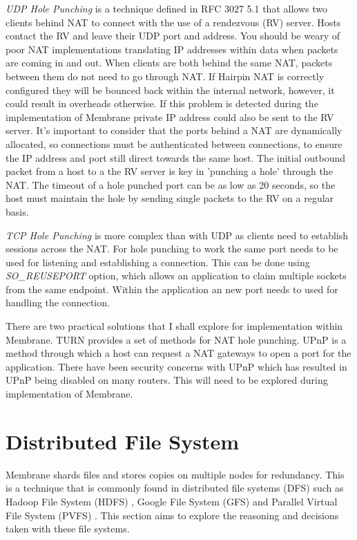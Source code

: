 \documentclass[11pt, a4paper, twocolumn, twoside]{report}
\begin{document}
\emph{UDP Hole Punching} is a technique defined in RFC 3027 5.1 \citep{holdrege2001rfc} that allows two clients behind NAT to connect with the use of a rendezvous (RV) server. Hosts contact the RV and leave their UDP port and address. You should be weary of poor NAT implementations translating IP addresses within data when packets are coming in and out. \citep{ford2005peer} When clients are both behind the same NAT, packets between them do not need to go through NAT. If Hairpin NAT is correctly configured they will be bounced back within the internal network, however, it could result in overheads otherwise. If this problem is detected during the implementation of Membrane private IP address could also be sent to the RV server. It's important to consider that the ports behind a NAT are dynamically allocated, so connections must be authenticated between connections, to ensure the IP address and port still direct towards the same host. The initial outbound packet from a host to a the RV server is key in 'punching a hole' through the NAT. The timeout of a hole punched port can be as low as 20 seconds, so the host must maintain the hole by sending single packets to the RV on a regular basis.

\emph{TCP Hole Punching} is more complex than with UDP as clients need to establish sessions across the NAT. For hole punching to work the same port needs to be used for listening and establishing a connection. This can be done using \emph{SO\_REUSEPORT} option, which allows an application to claim multiple sockets from the same endpoint. Within the application an new port needs to used for handling the connection.

There are two practical solutions that I shall explore for implementation within Membrane. TURN \citep{wing2010traversal} provides a set of methods for NAT hole punching. UPnP \citep{boucadair2013universal} is a method through which a host can request a NAT gateways to open a port for the application. There have been security concerns with UPnP which has resulted in UPnP being disabled on many routers. This will need to be explored during implementation of Membrane.

\section{Distributed File System}

Membrane shards files and stores copies on multiple nodes for redundancy. This is a technique that is commonly found in distributed file systems (DFS) such as Hadoop File System (HDFS) \citep{hdfsAnalysis}, Google File System (GFS) \citep{TheGFS} and Parallel Virtual File System (PVFS) \citep{ross2000pvfs}. This section aims to explore the reasoning and decisions taken with these file systems.
\end{document}

